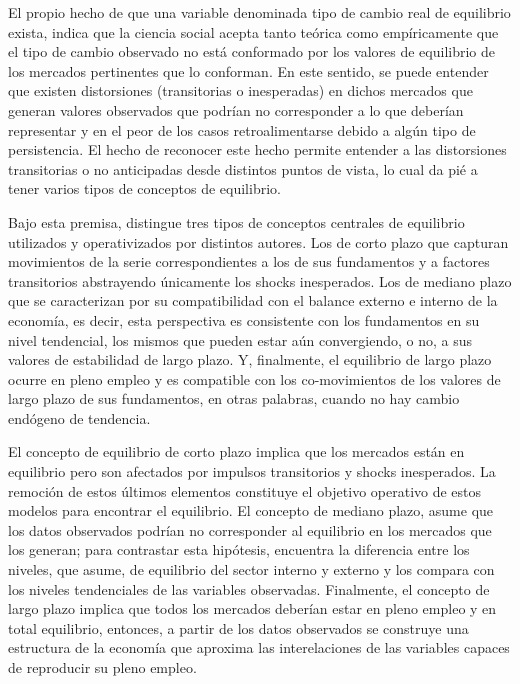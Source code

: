 \documentclass[12pt,letterpaper]{article}
\begin{document}
El propio hecho de que una variable denominada tipo de cambio real de equilibrio exista, indica que la ciencia social acepta tanto teórica como empíricamente que el tipo de cambio observado no está conformado por los valores de equilibrio de los mercados pertinentes que lo conforman. En este sentido, se puede entender que existen distorsiones (transitorias o inesperadas) en dichos mercados que generan valores observados que podrían no corresponder a lo que deberían representar y en el peor de los casos retroalimentarse debido a algún tipo de persistencia. El hecho de reconocer este hecho permite entender a las distorsiones transitorias o no anticipadas desde distintos puntos de vista, lo cual da pié a tener varios tipos de conceptos de equilibrio.

Bajo esta premisa, \cite{driver2005concepts} distingue tres tipos de conceptos centrales de equilibrio utilizados y operativizados por distintos autores. Los de corto plazo que capturan movimientos de la serie correspondientes a los de sus fundamentos y a factores transitorios abstrayendo únicamente los shocks inesperados. Los de mediano plazo que se caracterizan por su compatibilidad con el balance externo e interno de la economía, es decir, esta perspectiva es consistente con los fundamentos en su nivel tendencial, los mismos que pueden estar aún convergiendo, o no, a sus valores de estabilidad de largo plazo. Y, finalmente, el equilibrio de largo plazo ocurre en pleno empleo y es compatible con los co-movimientos de los valores de largo plazo de sus fundamentos, en otras palabras, cuando no hay cambio endógeno de tendencia.

El concepto de equilibrio de corto plazo implica que los mercados están en equilibrio pero son afectados por impulsos transitorios y shocks inesperados. La remoción de estos últimos elementos constituye el objetivo operativo de estos modelos para encontrar el equilibrio. El concepto de mediano plazo, asume que los datos observados podrían no corresponder al equilibrio en los mercados que los generan; para contrastar esta hipótesis, encuentra la diferencia entre los niveles, que asume, de equilibrio del sector interno y externo y los compara con los niveles tendenciales de las variables observadas. Finalmente, el concepto de largo plazo implica que todos los mercados deberían estar en pleno empleo y en total equilibrio, entonces, a partir de los datos observados se construye una estructura de la economía que aproxima las interelaciones de las variables capaces de reproducir su pleno empleo.
\end{document}
